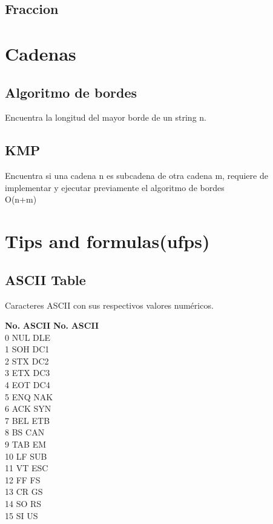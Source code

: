 \documentclass[10pt,landscape,twocolumn,a4paper,notitlepage]{article}
\newcommand\cppfile[2][]{

}
\begin{document}
			\subsection{Fraccion}
			\cppfile[5-72]{matematicas/fraccion.cpp}
			
		\section{Cadenas}
			\subsection{Algoritmo de bordes}
			Encuentra la longitud del mayor borde de un string n.
			\cppfile[4-16]{cadenas/bordes.cpp}
			\subsection{KMP}
			Encuentra si una cadena n es subcadena de otra cadena m, requiere de implementar
			y ejecutar previamente el algoritmo de bordes\\
			O(n+m)
			\cppfile[18-29]{cadenas/kmp.cpp}
	
	\newpage
	\section{Tips and formulas(ufps)}

\subsection{ASCII Table}
Caracteres ASCII con sus respectivos valores numéricos.


\begin{tabbing}
\textbf{No.}\hspace{1cm} \=  \textbf{ASCII}\hspace{2cm} \= \textbf{No.}\hspace{1cm} \= \textbf{ASCII}\hspace{2cm}  \\ 
0 \> NUL  \> DLE \\
1 \> SOH  \> DC1 \\
2 \> STX  \> DC2 \\
3 \> ETX  \> DC3 \\
4 \> EOT  \> DC4 \\
5 \> ENQ  \> NAK \\
6 \> ACK  \> SYN \\
7 \> BEL  \> ETB \\
8 \> BS  \> CAN \\
9 \> TAB  \> EM \\
10 \> LF  \> SUB \\
11 \> VT  \> ESC \\
12 \> FF  \> FS \\
13 \> CR  \> GS \\
14 \> SO  \> RS \\
15 \> SI  \> US \\ 
\end{tabbing}
\end{document}
